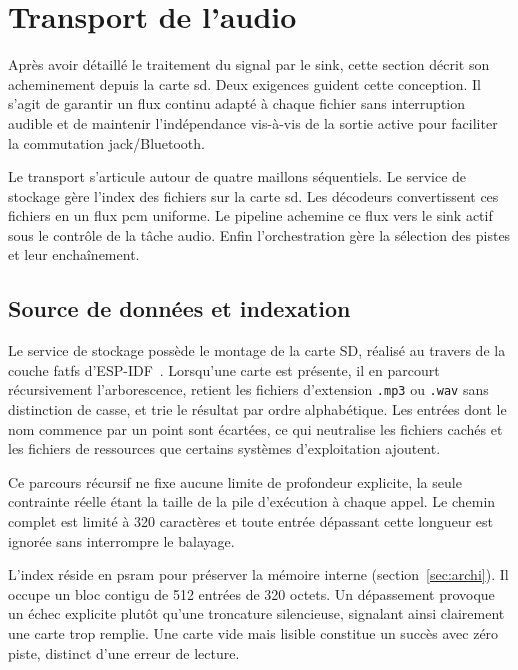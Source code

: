 \section{Transport de l'audio}
\label{sec:transport}

Après avoir détaillé le traitement du signal par le \gls{sink}, cette section décrit son acheminement depuis la carte \gls{sd}. Deux exigences guident cette conception. Il s'agit de garantir un flux continu adapté à chaque fichier sans interruption audible et de maintenir l'indépendance vis-à-vis de la sortie active pour faciliter la commutation jack/Bluetooth.

Le transport s'articule autour de quatre maillons séquentiels. Le service de stockage gère l'index des fichiers sur la carte \gls{sd}. Les décodeurs convertissent ces fichiers en un flux \gls{pcm} uniforme. Le pipeline achemine ce flux vers le \gls{sink} actif sous le contrôle de la tâche audio. Enfin l'orchestration gère la sélection des pistes et leur enchaînement.

\subsection{Source de données et indexation}

Le service de stockage possède le montage de la carte SD, réalisé au travers de la couche \gls{fatfs} d'ESP-IDF~\cite{ESP32_IDF_guide}. Lorsqu'une carte est présente, il en parcourt récursivement l'arborescence, retient les fichiers d'extension \texttt{.mp3} ou \texttt{.wav} sans distinction de casse, et trie le résultat par ordre alphabétique. Les entrées dont le nom commence par un point sont écartées, ce qui neutralise les fichiers cachés et les fichiers de ressources que certains systèmes d'exploitation ajoutent.

Ce parcours récursif ne fixe aucune limite de profondeur explicite, la seule contrainte réelle étant la taille de la pile d'exécution à chaque appel. Le chemin complet est limité à 320 caractères et toute entrée dépassant cette longueur est ignorée sans interrompre le balayage.

L'index réside en \gls{psram} pour préserver la mémoire interne (section~\ref{sec:archi}). Il occupe un bloc contigu de 512 entrées de 320 octets. Un dépassement provoque un échec explicite plutôt qu'une troncature silencieuse, signalant ainsi clairement une carte trop remplie. Une carte vide mais lisible constitue un succès avec zéro piste, distinct d'une erreur de lecture.


